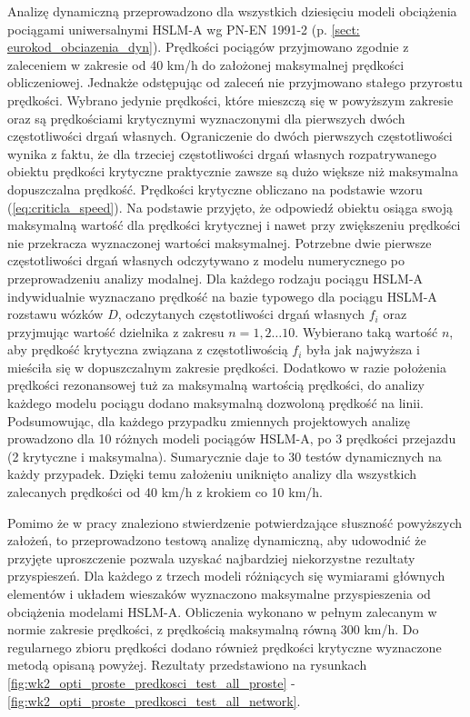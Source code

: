 Analizę dynamiczną przeprowadzono dla wszystkich dziesięciu modeli obciążenia pociągami uniwersalnymi HSLM-A wg PN-EN 1991-2 (p. \ref{sect: eurokod_obciazenia_dyn}). Prędkości pociągów przyjmowano zgodnie z zaleceniem w zakresie od 40 km/h do założonej maksymalnej prędkości obliczeniowej. Jednakże odstępując od zaleceń nie przyjmowano stałego przyrostu prędkości. Wybrano jedynie prędkości, które mieszczą się w powyższym zakresie oraz są prędkościami krytycznymi wyznaczonymi dla pierwszych dwóch częstotliwości drgań własnych.  Ograniczenie do dwóch pierwszych częstotliwości wynika z faktu, że dla trzeciej częstotliwości drgań własnych rozpatrywanego obiektu prędkości krytyczne praktycznie zawsze są dużo większe niż maksymalna dopuszczalna prędkość. Prędkości krytyczne obliczano na podstawie wzoru (\ref{eq:criticla_speed}). Na podstawie \parencite{Goicolea2008} przyjęto, że odpowiedź obiektu osiąga swoją maksymalną wartość dla prędkości krytycznej i nawet przy zwiększeniu prędkości nie przekracza wyznaczonej wartości maksymalnej. Potrzebne dwie pierwsze częstotliwości drgań własnych odczytywano z modelu numerycznego po przeprowadzeniu analizy modalnej. Dla każdego rodzaju pociągu HSLM-A indywidualnie wyznaczano prędkość na bazie typowego dla pociągu HSLM-A rozstawu wózków $D$, odczytanych częstotliwości drgań własnych $f_i$ oraz przyjmując wartość dzielnika z zakresu $n = 1,2\dots 10$. Wybierano taką wartość $n$, aby prędkość krytyczna związana z częstotliwością $f_i$ była jak najwyższa i mieściła się w dopuszczalnym zakresie prędkości. Dodatkowo w razie położenia prędkości rezonansowej tuż za maksymalną wartością prędkości, do analizy każdego modelu pociągu dodano maksymalną dozwoloną prędkość na linii. Podsumowując, dla każdego przypadku zmiennych projektowych analizę prowadzono dla 10 różnych modeli pociągów HSLM-A, po 3 prędkości przejazdu (2 krytyczne i maksymalna). Sumarycznie daje to 30 testów dynamicznych na każdy przypadek. Dzięki temu założeniu uniknięto analizy dla wszystkich zalecanych prędkości od 40 km/h z krokiem co 10 km/h. 

Pomimo że w pracy \parencite{Goicolea2008} znaleziono stwierdzenie potwierdzające słuszność powyższych założeń, to przeprowadzono testową analizę dynamiczną, aby udowodnić że przyjęte uproszczenie pozwala uzyskać najbardziej niekorzystne rezultaty przyspieszeń. Dla każdego z trzech modeli różniących się wymiarami głównych elementów i układem wieszaków wyznaczono maksymalne przyspieszenia od obciążenia modelami HSLM-A. Obliczenia wykonano w pełnym zalecanym w normie zakresie prędkości, z prędkością maksymalną równą 300 km/h. Do regularnego zbioru prędkości dodano również prędkości krytyczne wyznaczone metodą opisaną powyżej. Rezultaty przedstawiono na rysunkach \ref{fig:wk2_opti_proste_predkosci_test_all_proste} - \ref{fig:wk2_opti_proste_predkosci_test_all_network}. 

